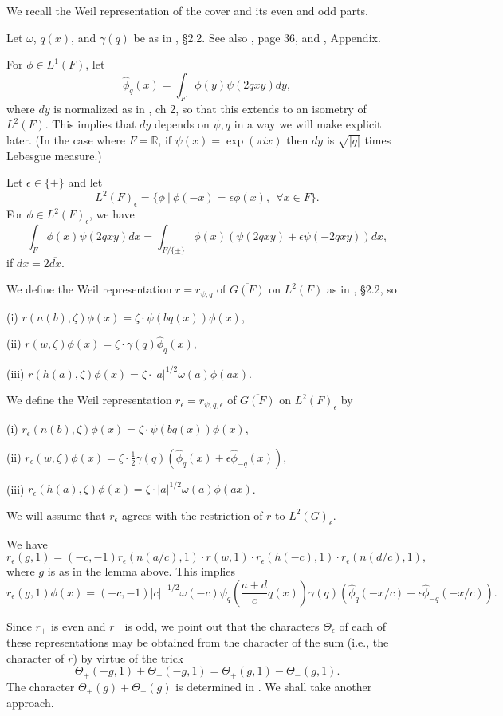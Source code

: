 \documentclass[12pt,letterpaper]{book}
\theoremstyle{plain}
\theoremstyle{definition}
\theoremstyle{remark}
\theoremstyle{remark}
\begin{document}
We recall the Weil representation of the cover and its even and odd parts.


Let $\omega$, $q(x)$, and $\gamma(q)$ be as in \cite{Fl}, \S 2.2. See also
\cite{Ge2}, page 36, and \cite{Rao}, Appendix.

For $\phi \in L^1(F)$, let
\[
\hat{\phi}_q(x)=\int_F \phi(y)\psi(2qxy)dy,
\]
where $dy$ is normalized as in \cite{Ge2}, ch 2, so that this extends to
an isometry of $L^2(F)$. This implies that $dy$ depends on $\psi, q$
in a way we will make explicit later.
(In the case where $F={\mathbb{R}}$, if $\psi(x)=\exp(\pi i x)$ then
$dy$ is $\sqrt{|q|}$ times Lebesgue measure.)

Let $\epsilon \in \{\pm\}$ and let
\[
L^2(F)_\epsilon=
\{\phi \ |\ \phi(-x)=\epsilon \phi(x),\ \ \forall x\in F\}.
\]
For $\phi\in L^2(F)_\epsilon$, we have
\[
\int_F \phi(x)\psi(2qxy)dx =
\int_{F/\{\pm \}}
\phi(x) (\psi(2qxy)+\epsilon \psi(-2qxy))\overline{dx},
\]
if $dx=2\overline{dx}$.

We define the Weil representation $r=r_{\psi,q}$ of
$\overline{G(F)}$ on $L^2(F)$ as in \cite{Fl}, \S 2.2, so

(i) $r(n(b),\zeta)\phi(x)=\zeta\cdot \psi(bq(x))\phi(x)$,

(ii) $r(w,\zeta)\phi(x)
=\zeta\cdot \gamma(q)\hat{\phi}_q(x)$,

(iii) $r(h(a),\zeta)\phi(x)=\zeta\cdot |a|^{1/2}\omega(a)\phi(ax)$.

We define the Weil representation $r_\epsilon=r_{\psi,q,\epsilon}$ of
$\overline{G(F)}$ on $L^2(F)_\epsilon$ by

(i) $r_\epsilon(n(b),\zeta)\phi(x)=\zeta\cdot \psi(bq(x))\phi(x)$,

(ii) $r_\epsilon(w,\zeta)\phi(x)
=\zeta\cdot {\frac{1}{2}}\gamma(q)(\hat{\phi}_q(x)
+\epsilon \hat{\phi}_{-q}(x))$,

(iii) $r_\epsilon(h(a),\zeta)\phi(x)=\zeta\cdot |a|^{1/2}\omega(a)\phi(ax)$.

We will assume that $r_\epsilon$ agrees with the restriction of
$r$ to $L^2(G)_\epsilon$.

We have
\[
r_\epsilon(g,1)=(-c,-1)
r_\epsilon(n(a/c),1)\cdot r(w,1)\cdot r_\epsilon(h(-c),1)
\cdot r_\epsilon(n(d/c),1),
\]
where $g$ is as in the lemma above. This implies
\[
r_\epsilon(g,1)\phi(x)=(-c,-1)|c|^{-1/2}\omega(-c)
\psi_q({\frac{a+d}{c}}q(x))
\gamma(q)(\hat{\phi}_q(-x/c)+
\epsilon \hat{\phi}_{-q}(-x/c)).
\]

Since $r_+$ is even and $r_-$ is odd, we point out that
the characters $\Theta_\epsilon$ of each of these
representations may be obtained from the
character of the sum (i.e., the character of $r$)
by virtue of the trick
\[
\Theta_+(-g,1)+\Theta_-(-g,1)=
\Theta_+(g,1)-\Theta_-(g,1).
\]
The character $\Theta_+(g)+\Theta_-(g)$ is determined in \cite{H}.
We shall take another approach.
\end{document}
